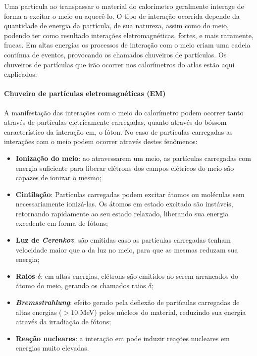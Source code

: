 Uma partícula ao transpassar o material do calorímetro geralmente interage de
forma a excitar o meio ou aquecê-lo. O tipo de interação ocorrida depende da
quantidade de energia da partícula, de sua natureza, assim como do
meio, podendo ter como resultado interações eletromagnéticas, fortes, e mais 
raramente, fracas. Em altas energias os processos de interação com o meio 
criam uma cadeia contínua de eventos, provocando os chamados chuveiros de partículas. 
Os chuveiros de partículas que irão ocorrer nos calorímetros do \gls{atlas} 
estão aqui explicados:

\paragraph{Chuveiro de partículas eletromagnéticas (EM)}
\label{par:chuveiro_em}

A manifestação das interações  com o meio do calorímetro 
podem ocorrer tanto através de partículas eletricamente carregadas, 
quanto através do bóssom característico da interação
\gls{em}, o fóton. No caso de partículas carregadas 
as interações com o meio podem ocorrer através destes fenômenos:

\begin{itemize}
\item \textbf{Ionização do meio}: ao atravessarem um meio, as partículas
carregadas com energia suficiente para liberar elétrons dos campos elétricos do
meio são capazes de ionizar o mesmo;
\item \textbf{Cintilação}: Partículas carregadas podem excitar átomos ou
moléculas sem necessariamente ionizá-las. Os átomos em estado excitado são
instáveis, retornando rapidamente ao seu estado relaxado, liberando sua energia
excedente em forma de fótons;
\item \textbf{Luz de \emph{\~Cerenkov}}: são emitidas caso as partículas carregadas tenham
velocidade maior que a da luz no meio, para que as mesmas reduzam sua energia;
\item \textbf{Raios $\delta$}: em altas energias, elétrons são emitidos ao serem
arrancados do átomo do meio, gerando os chamados raios $\delta$;
\item \textbf{\emph{Bremsstrahlung}}: efeito gerado pela deflexão de partículas
carregadas de altas energias ($>10$ MeV) pelos núcleos do material, reduzindo sua energia 
através da irradiação de fótons;
\item \textbf{Reação nucleares}: a interação \gls{em} pode induzir
reações nucleares em energias muito elevadas.
\end{itemize}

